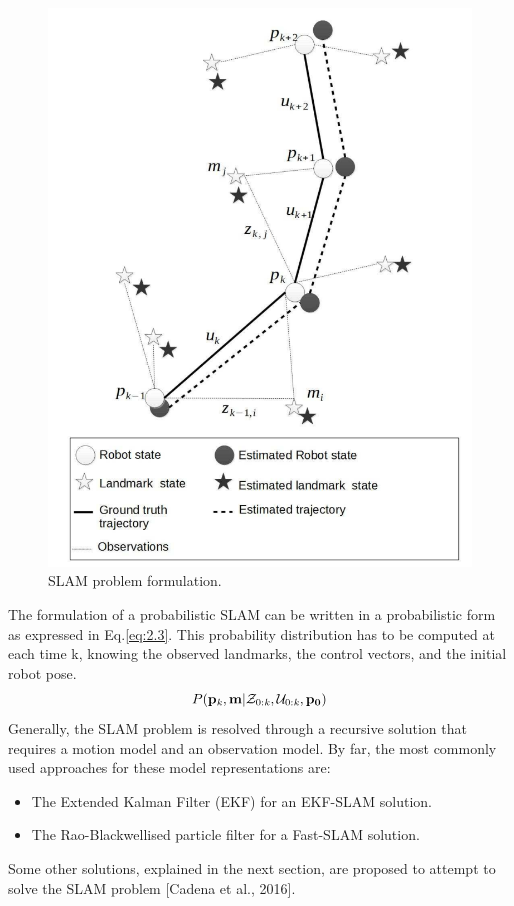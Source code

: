 \begin{figure}[H]
    \centering
    \includegraphics[width=\linewidth]{assets/2_4.png}
    \caption{SLAM problem formulation.}
    \label{fig:2.4}
\end{figure}
The formulation of a probabilistic SLAM can be written in a probabilistic form as expressed in Eq.\ref{eq:2.3}. This probability distribution has to be computed at each time k, knowing the observed landmarks, the control vectors, and the initial robot pose.
\begin{equation} \label{eq:2.3}
    P(\mathbf{p_\mathit{k}},\mathbf{m} \vert \mathcal{Z_\text{0:\textit{k}}},\mathcal{U_\text{0:\textit{k}}},\mathbf{p_0})
\end{equation}
Generally, the SLAM problem is resolved through a recursive solution that requires a motion model and an observation model. By far, the most commonly used approaches for these model representations are:
\begin{itemize}
    \item The Extended Kalman Filter (EKF) for an EKF-SLAM solution.
    \item The Rao-Blackwellised particle ﬁlter for a Fast-SLAM solution.
\end{itemize}
Some other solutions, explained in the next section, are proposed to attempt to solve the SLAM problem [Cadena et al., 2016].
